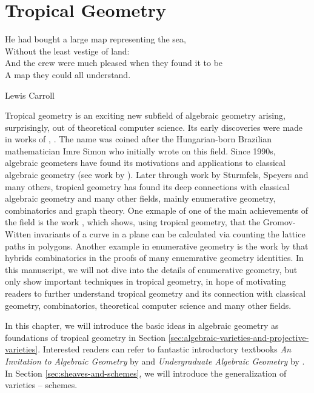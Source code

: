 \chapter{Tropical Geometry}
\label{chp:tropical-geometry}
\epigraph{
He had bought a large map representing the sea, \\
Without the least vestige of land:\\
And the crew were much pleased when they found it to be \\
A map they could all understand. 
}{Lewis Carroll}

   Tropical geometry is an exciting new subfield of algebraic geometry
   arising, surprisingly, out of theoretical computer science. 
   Its early discoveries were made in works of \citet{Bergman1971},
   \citet{Bieri1984}. 
   The name was coined after the Hungarian-born Brazilian mathematician Imre Simon who initially wrote on this field.
   Since 1990s, algebraic geometers have found its motivations 
   and applications to classical algebraic geometry 
   (see work by \citet{Mikhalkin2006}). 
   Later through work by Sturmfels, Speyers and many others,
   tropical geometry has found its deep connections with 
   classical algebraic geometry and many other fields,
   mainly enumerative geometry, combinatorics and graph theory. 
   One exmaple of one of the main achievements of the field is the work \citet{Mikhalkin2003},
   which shows, using tropical geometry, that
   the Gromov-Witten invariants of a curve in a plane can be calculated 
   via counting the lattice paths in polygons. 
   Another example in enumerative geometry is the work by \citet{Gathmann2005}
   that hybrids combinatorics in the proofs of many enuemrative geometry identities. 
   In this manuscript, we will not dive into the details of enumerative geometry, but only show important techniques in tropical geometry, 
   in hope of motivating readers to further understand tropical geometry
   and its connection with classical geometry, combinatorics, theoretical computer science and many other fields.
   
   In this chapter, we will introduce the basic ideas in algebraic geometry
   as foundations of tropical geometry in Section 
   \ref{sec:algebraic-varieties-and-projective-varieties}. 
   Interested readers can refer to fantastic introductory textbooks
   \textit{An Invitation to Algebraic Geometry} by \citet{Smith2000}
   and \textit{Undergraduate Algebraic Geometry} by \citet{Reid1988}. 
   In Section \ref{sec:sheaves-and-schemes}, we will introduce the generalization of varieties -- schemes. 
   

    
	
	
	
	
	
	
	
	